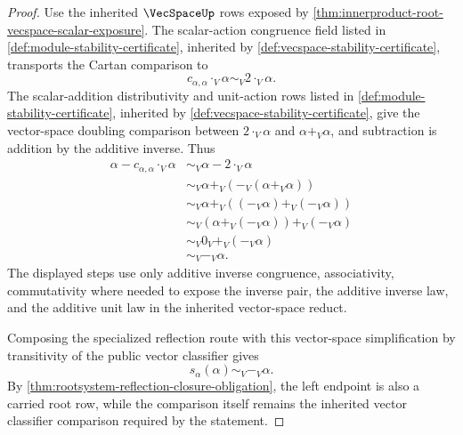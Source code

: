 \begin{proof}
Use the inherited $\VecSpaceUp$ rows exposed by \autoref{thm:innerproduct-root-vecspace-scalar-exposure}. The scalar-action congruence field listed in \autoref{def:module-stability-certificate}, inherited by \autoref{def:vecspace-stability-certificate}, transports the Cartan comparison to
$$
c_{\alpha,\alpha}\cdot_V\alpha
\sim_V
2\cdot_V\alpha.
$$
The scalar-addition distributivity and unit-action rows listed in \autoref{def:module-stability-certificate}, inherited by \autoref{def:vecspace-stability-certificate}, give the vector-space doubling comparison between $2\cdot_V\alpha$ and $\alpha+_V\alpha$, and subtraction is addition by the additive inverse. Thus
$$
\begin{aligned}
\alpha-c_{\alpha,\alpha}\cdot_V\alpha
&\sim_V \alpha-2\cdot_V\alpha \\
&\sim_V \alpha+_V(-_V(\alpha+_V\alpha)) \\
&\sim_V \alpha+_V((-_V\alpha)+_V(-_V\alpha)) \\
&\sim_V (\alpha+_V(-_V\alpha))+_V(-_V\alpha) \\
&\sim_V 0_V+_V(-_V\alpha) \\
&\sim_V -_V\alpha.
\end{aligned}
$$
The displayed steps use only additive inverse congruence, associativity, commutativity where needed to expose the inverse pair, the additive inverse law, and the additive unit law in the inherited vector-space reduct.

Composing the specialized reflection route with this vector-space simplification by transitivity of the public vector classifier gives
$$
s_\alpha(\alpha)\sim_V -_V\alpha.
$$
By \autoref{thm:rootsystem-reflection-closure-obligation}, the left endpoint is also a carried root row, while the comparison itself remains the inherited vector classifier comparison required by the statement.
\end{proof}
